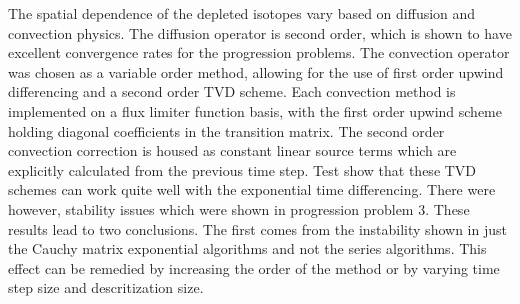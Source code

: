 The spatial dependence of the depleted isotopes vary based on diffusion and convection physics. The diffusion operator is second order, which is shown to have excellent convergence rates for the progression problems. The convection operator was chosen as a variable order method, allowing for the use of first order upwind differencing and a second order TVD scheme. Each convection method is implemented on a flux limiter function basis, with the first order upwind scheme holding diagonal coefficients in the transition matrix. The second order convection correction is housed as constant linear source terms which are explicitly calculated from the previous time step. Test show that these TVD schemes can work quite well with the exponential time differencing. There were however, stability issues which were shown in progression problem 3. These results lead to two conclusions. The first comes from the instability shown in just the Cauchy matrix exponential algorithms and not the series algorithms. This effect can be remedied by increasing the order of the method or by varying time step size and descritization size. 

